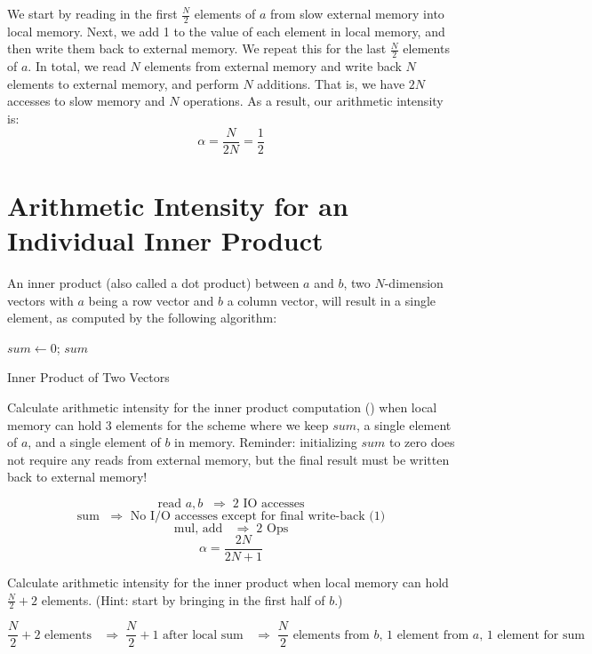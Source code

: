 \documentclass[a4 paper]{article}
\begin{document}
We start by reading in the first $\frac{N}{2}$ elements of $a$ from slow external memory into local memory.
Next, we add 1 to the value of each element in local memory, and then write them back to external memory.
We repeat this for the last $\frac{N}{2}$ elements of $a$.
In total, we read $N$ elements from external memory and write back $N$ elements to external memory, and perform $N$ additions.
That is, we have $2N$ accesses to slow memory and $N$ operations.
As a result, our arithmetic intensity is:
\[
\alpha = \frac{N}{2N} = \frac{1}{2}
\]

\noindent

\newpage
\section{Arithmetic Intensity for an Individual Inner Product}
\label{sec:ip_ai}
An inner product (also called a dot product) between $a$ and $b$, two $N$-dimension vectors  with $a$ being a row vector and $b$ a column vector, will result in a single element, as computed by the following algorithm:

\begin{algorithm}
\SetAlgoLined
\SetInd{0.25em}{0.5em}
$sum \longleftarrow 0$;
\Return $sum$
\caption{Inner Product of Two Vectors}
\label{algo:inner-product}
\end{algorithm}

Calculate arithmetic intensity for the inner product computation () when local memory can hold 3 elements for the scheme where we keep $sum$, a single element of $a$, and a single element of $b$ in memory.
Reminder: initializing $sum$ to zero does not require any reads from external memory, but the final result must be written back to external memory!


\[
\text{read } a, b \;\;\Rightarrow\; 2 \text{ IO accesses}
\]
\[
\text{sum } \;\;\Rightarrow\; \text{ No I/O accesses except for final write-back (1)}
\]
\[
\text{mul, add } \;\;\Rightarrow\; 2 \text{ Ops}
\]
\[
\alpha = \frac{2N}{2N+1}
\]

Calculate arithmetic intensity for the inner product when local memory can hold $\frac{N}{2} + 2$ elements.
(Hint: start by bringing in the first half of $b$.)


\[
\frac{N}{2} + 2 \text{ elements } \;\;\Rightarrow\; \frac{N}{2} + 1 \text{ after local sum } \;\;\Rightarrow\; \frac{N}{2} \text{ elements from $b$, 1 element from $a$, 1 element for sum}
\]
\end{document}
